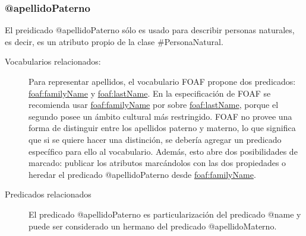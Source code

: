 \subsubsection{@apellidoPaterno}

El preidicado @apellidoPaterno sólo es usado para describir personas
naturales, es decir, es un atributo propio de la clase
\#PersonaNatural.

\begin{description}
  
\item[{\sf Vocabularios relacionados:}]
  Para representar apellidos, el vocabulario FOAF propone dos
  predicados:
  \url{foaf:familyName} y \url{foaf:lastName}. En la especificación de
  FOAF se recomienda usar \url{foaf:familyName} por sobre
  \url{foaf:lastName}, porque el segundo posee un ámbito cultural más
  restringido. FOAF no provee una forma de distinguir entre los
  apellidos paterno y materno, lo que significa que si se quiere hacer
  una distinción, se debería agregar un predicado específico para ello
  al vocabulario. Además, esto abre dos posibilidades de marcado:
  publicar los atributos marcándolos con las dos propiedades o heredar
  el predicado @apellidoPaterno desde \url{foaf:familyName}.
\item[{\sf Predicados relacionados}]
  El predicado @apellidoPaterno es particularización del
  predicado @name y puede ser considerado un hermano del predicado
  @apellidoMaterno.
\end{description}
